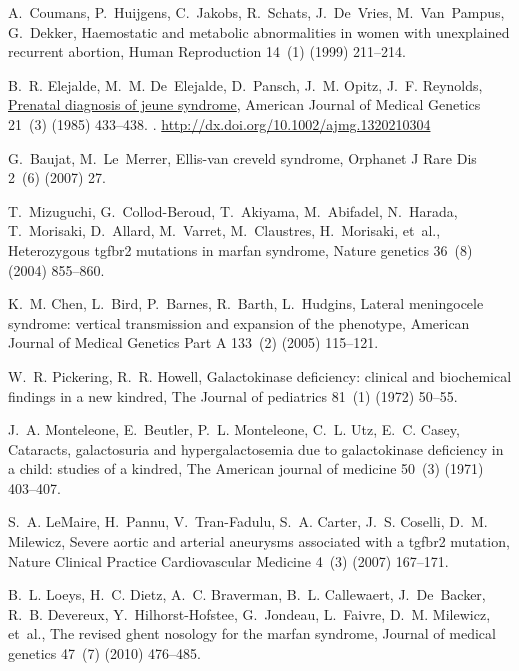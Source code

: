 \documentclass{article}
\theoremstyle{definition}
\begin{document}
\begin{thebibliography}{10}
A.~Coumans, P.~Huijgens, C.~Jakobs, R.~Schats, J.~De~Vries, M.~Van~Pampus,
  G.~Dekker, Haemostatic and metabolic abnormalities in women with unexplained
  recurrent abortion, Human Reproduction 14~(1) (1999) 211--214.

B.~R. Elejalde, M.~M. De~Elejalde, D.~Pansch, J.~M. Opitz, J.~F. Reynolds,
  \href{http://dx.doi.org/10.1002/ajmg.1320210304}{Prenatal diagnosis of jeune
  syndrome}, American Journal of Medical Genetics 21~(3) (1985) 433--438.
\newblock \href {http://dx.doi.org/10.1002/ajmg.1320210304}
  {}.
\newline\urlprefix\url{http://dx.doi.org/10.1002/ajmg.1320210304}

G.~Baujat, M.~Le~Merrer, Ellis-van creveld syndrome, Orphanet J Rare Dis 2~(6)
  (2007) 27.

T.~Mizuguchi, G.~Collod-Beroud, T.~Akiyama, M.~Abifadel, N.~Harada,
  T.~Morisaki, D.~Allard, M.~Varret, M.~Claustres, H.~Morisaki, et~al.,
  Heterozygous tgfbr2 mutations in marfan syndrome, Nature genetics 36~(8)
  (2004) 855--860.

K.~M. Chen, L.~Bird, P.~Barnes, R.~Barth, L.~Hudgins, Lateral meningocele
  syndrome: vertical transmission and expansion of the phenotype, American
  Journal of Medical Genetics Part A 133~(2) (2005) 115--121.

W.~R. Pickering, R.~R. Howell, Galactokinase deficiency: clinical and
  biochemical findings in a new kindred, The Journal of pediatrics 81~(1)
  (1972) 50--55.

J.~A. Monteleone, E.~Beutler, P.~L. Monteleone, C.~L. Utz, E.~C. Casey,
  Cataracts, galactosuria and hypergalactosemia due to galactokinase deficiency
  in a child: studies of a kindred, The American journal of medicine 50~(3)
  (1971) 403--407.

S.~A. LeMaire, H.~Pannu, V.~Tran-Fadulu, S.~A. Carter, J.~S. Coselli, D.~M.
  Milewicz, Severe aortic and arterial aneurysms associated with a tgfbr2
  mutation, Nature Clinical Practice Cardiovascular Medicine 4~(3) (2007)
  167--171.

B.~L. Loeys, H.~C. Dietz, A.~C. Braverman, B.~L. Callewaert, J.~De~Backer,
  R.~B. Devereux, Y.~Hilhorst-Hofstee, G.~Jondeau, L.~Faivre, D.~M. Milewicz,
  et~al., The revised ghent nosology for the marfan syndrome, Journal of
  medical genetics 47~(7) (2010) 476--485.


\end{thebibliography}
\end{document}
